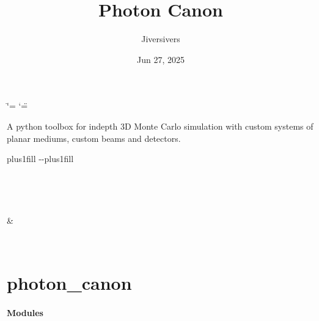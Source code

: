 \documentclass[letterpaper,10pt,english]{sphinxmanual}
\title{Photon Canon}
\date{Jun 27, 2025}
\author{Jiversivers}
\begin{document}
\ifdefined\shorthandoff
  \ifnum\catcode`\=\string=\active\shorthandoff{=}\fi
  \ifnum\catcode`\"=\active{}\fi
\fi

\pagestyle{empty}
\sphinxmaketitle
\pagestyle{plain}
\sphinxtableofcontents
\pagestyle{normal}
\label{\detokenize{index::doc}}


\sphinxAtStartPar
A python toolbox for in\sphinxhyphen{}depth 3D Monte Carlo simulation with custom systems of planar mediums, custom beams and detectors.


\begin{savenotes}
\sphinxatlongtablestart
\sphinxthistablewithglobalstyle
\sphinxthistablewithnovlinesstyle
\makeatletter
  \LTleft \@totalleftmargin plus1fill
  \LTright\dimexpr\columnwidth-\@totalleftmargin-\linewidth\relax plus1fill
\makeatother
\begin{longtable}{}
\sphinxtoprule
\endfirsthead

\\
\sphinxtoprule
\endhead

\sphinxbottomrule
{}\\
\endfoot

\endlastfoot
\sphinxtableatstartofbodyhook

\sphinxAtStartPar
{\hyperref[\detokenize{generated/photon_canon:module-photon_canon}]{}}
&
\sphinxAtStartPar

\\
\sphinxbottomrule
\end{longtable}
\sphinxtableafterendhook
\sphinxatlongtableend
\end{savenotes}

\sphinxstepscope


\chapter{photon\_canon}
\label{\detokenize{generated/photon_canon:module-photon_canon}}\label{\detokenize{generated/photon_canon:photon-canon}}\label{\detokenize{generated/photon_canon::doc}}\subsubsection*{Modules}
\end{document}
